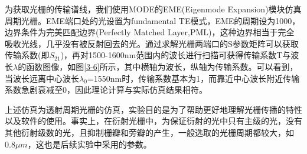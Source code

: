 \documentclass[UTF8,a4paper,12pt]{ctexart}
\numberwithin{equation}{section}
\begin{document}
为获取光栅的传输谱线，我们使用MODE的EME(Eigenmode Expansion)模块仿真周期光栅。EME端口处的光设置为fundamental TE模式，EME的周期设为1000，边界条件为完美匹配边界(Perfectly Matched  Layer,PML)，这种边界相当于完全吸收光线，几乎没有被反射回去的光。通过求解光栅两端口的S参数矩阵可以获取传输系数(即$S_{21}$)，再对1500-1600nm范围内的波长进行扫描可获得传输系数T与波长$\lambda$的函数图像，如图\ref{3-6}所示，其中横轴为波长，纵轴为传输系数。可以看到，当波长远离中心波长$\lambda_0$=1550nm时，传输系数基本为1，而靠近中心波长附近传输系数急剧衰减至0，因此理论计算与实际仿真结果相符。

上述仿真为透射周期光栅的仿真，实验目的是为了帮助更好地理解光栅传播的特性以及软件的使用。事实上，在衍射光栅中，为保证衍射的光中只有主级的光，没有其他衍射级数的光，且抑制栅瓣和旁瓣的产生，一般选取的光栅周期都较大，如0.8$\mu m$，这也是后续实验中采用的参数。
\end{document}
